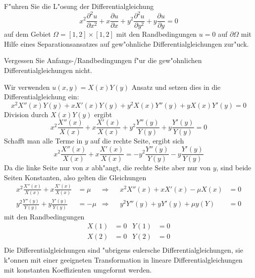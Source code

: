F"uhren Sie die L"osung der Differentialgleichung
\[
x^2\frac{\partial^2 u}{\partial x^2}
+x\frac{\partial u}{\partial x}
+y^2\frac{\partial^2 u}{\partial y^2}
+y\frac{\partial u}{\partial y}
=0
\]
auf dem Gebiet
$\Omega=[1,2]\times[1,2]$
mit den Randbedingungen
$u=0$ auf $\partial\Omega$
mit Hilfe eines Separationsansatzes auf gew"ohnliche Differentialgleichungen
zur"uck.

\begin{hinweis}
Vergessen Sie Anfangs-/Randbedingungen f"ur die gew"ohnlichen
Differentialgleichungen nicht.
\end{hinweis}

\begin{loesung}
Wir verwenden $u(x,y)=X(x)Y(y)$ Ansatz und setzen dies in die
Differentialgleichung ein:
\[
x^2X''(x)Y(y)
+xX'(x)Y(y)
+y^2X(x)Y''(y)
+yX(x)Y'(y)=0
\]
Division durch $X(x)Y(y)$ ergibt
\[
x^2\frac{X''(x)}{X(x)}
+x\frac{X'(x)}{X(x)}
+y^2\frac{Y''(y)}{Y(y)}
+y\frac{Y'(y)}{Y(y)}=0
\]
Schafft man alle Terme in $y$ auf die rechte Seite, ergibt sich
\[
x^2\frac{X''(x)}{X(x)}
+x\frac{X'(x)}{X(x)}
=
-y^2\frac{Y''(y)}{Y(y)}
-y\frac{Y'(y)}{Y(y)}
\]
Da die linke Seite nur von $x$ abh"angt, die rechte Seite aber nur
von $y$, sind beide Seiten Konstanten, also gelten die
Gleichungen
\begin{align*}
x^2\frac{X''(x)}{X(x)}
+x\frac{X'(x)}{X(x)}&=\mu
&\Rightarrow&
&
x^2X''(x)+xX'(x)-\mu X(x)&=0
\\
y^2\frac{Y''(y)}{Y(y)}
+y\frac{Y'(y)}{Y(y)}&=-\mu
&\Rightarrow&
&
y^2Y''(y)+yY'(y)+\mu y(Y)&=0
\end{align*}
mit den Randbedingungen
\begin{align*}
X(1)&=0&Y(1)&=0\\
X(2)&=0&Y(2)&=0\\
\end{align*}
Die Differentialgleichungen sind "ubrigens eulersche Differentialgleichungen,
sie k"onnen mit einer geeigneten Transformation in lineare
Differentialgleichungen mit konstanten Koeffizienten umgeformt werden.
\end{loesung}
